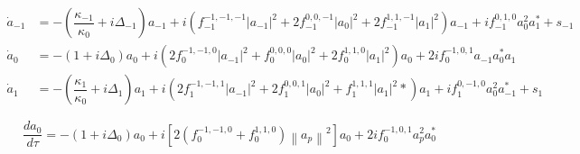 \documentclass[11pt]{article}
\begin{document}
\begin{equation*}
    \begin{aligned}
        \dot{a}_{-1} &= -\left(\dfrac{\kappa_{-1}}{\kappa_0} + i \Delta_{-1}\right)a_{-1} + 
        i \left(
            f_{-1}^{-1,-1,-1} \vert a_{-1}\vert^2 + 
            2f_{-1}^{0,0,-1} \vert a_0\vert^2 + 
            2f_{-1}^{1,1,-1} \vert a_1\vert^2
            \right)a_{-1} + 
        if_{-1}^{0,1,0} a_0^2a_1^* + s_{-1} \\
        \dot{a}_{0} &= -\left(1 + i \Delta_{0}\right)a_0 +  
        i \left(
            2f_{0}^{-1,-1,0} \vert a_{-1}\vert^2 + 
            f_{0}^{0,0,0} \vert a_0\vert^2 + 
            2f_{0}^{1,1,0} \vert a_1\vert^2
            \right)a_0 + 
        2if_{0}^{-1,0,1}a_{-1} a_0^* a_1\\
        \dot{a}_{1} &= -\left(\dfrac{\kappa_1}{\kappa_0} + i\Delta_1\right)a_ 1 + 
        i\left(2 f_{1}^{-1,-1,1} \vert a_{-1}\vert^2 +
        2 f_{1}^{0,0,1} \vert a_0\vert^2 +
        f_{1}^{1,1,1}\vert a_1\vert^2*
        \right)a_1 + 
        i f_{1}^{0,-1,0} a_0^2a_{-1}^* + s_1
        \end{aligned}
\end{equation*}


\begin{equation}
    \frac{d a_0}{d\tau} = 
    -\left(1 + i \Delta_0\right)a_0 + i\left[
        2 \left(f_0^{-1,-1,0} + f_0^{1,1,0}\right) \left\|a_p\right\|^2
    \right]a_0 + 2if_0^{-1,0,1}a_p^2a_0^*
\end{equation}
\end{document}
